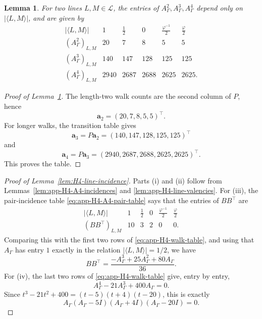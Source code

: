 \documentclass[11pt]{article}
\newtheorem{lemma}[theorem]{Lemma}
\theoremstyle{definition}
\begin{document}
\begin{lemma}\label{lem:app-H4-walk-counts}
For two lines \(L,M\in\mathcal L\), the entries of
\(A_{\Gamma}^{2},A_{\Gamma}^{3},A_{\Gamma}^{4}\) depend only on
\(|\langle L,M\rangle|\), and are given by
\begin{equation}\label{eq:app-H4-walk-table}
\begin{array}{c|ccccc}
|\langle L,M\rangle|
& 1 & \frac{1}{2} & 0 & \frac{\varphi^{-1}}{2} & \frac{\varphi}{2} \\
\hline
(A_{\Gamma}^{2})_{L,M}
& 20 & 7 & 8 & 5 & 5 \\
(A_{\Gamma}^{3})_{L,M}
& 140 & 147 & 128 & 125 & 125 \\
(A_{\Gamma}^{4})_{L,M}
& 2940 & 2687 & 2688 & 2625 & 2625 .
\end{array}
\end{equation}
\end{lemma}

\begin{proof}[Proof of Lemma~\ref{lem:app-H4-walk-counts}]
The length-two walk counts are the second column of \(P\), hence
\[
    \boldsymbol{a}_{2}=(20,7,8,5,5)^\top.
\]
For longer walks, the transition table gives
\[
    \boldsymbol{a}_{3}=P\boldsymbol{a}_{2}=(140,147,128,125,125)^\top
\]
and
\[
    \boldsymbol{a}_{4}=P\boldsymbol{a}_{3}=(2940,2687,2688,2625,2625)^\top.
\]
This proves the table.
\end{proof}

\begin{proof}[Proof of Lemma~\ref{lem:H4-line-incidence}]
Parts \textup{(i)} and \textup{(ii)} follow from
Lemmas~\ref{lem:app-H4-A4-incidences} and
\ref{lem:app-H4-line-valencies}.  For \textup{(iii)}, the pair-incidence
table \eqref{eq:app-H4-A4-pair-table} says that the entries of \(BB^\top\)
are
\[
\begin{array}{c|ccccc}
|\langle L,M\rangle|
& 1 & \frac{1}{2} & 0 & \frac{\varphi^{-1}}{2} & \frac{\varphi}{2} \\
\hline
(BB^\top)_{L,M}
& 10 & 3 & 2 & 0 & 0 .
\end{array}
\]
Comparing this with the first two rows of
\eqref{eq:app-H4-walk-table}, and using that \(A_{\Gamma}\) has entry \(1\)
exactly in the relation \(|\langle L,M\rangle|=1/2\), we have
\[
    BB^\top=\frac{-A_{\Gamma}^{3}+25A_{\Gamma}^{2}+80A_{\Gamma}}{36}.
\]
For \textup{(iv)}, the last two rows of \eqref{eq:app-H4-walk-table} give,
entry by entry,
\[
    A_{\Gamma}^{4}-21A_{\Gamma}^{3}+400A_{\Gamma}=0.
\]
Since \(t^{3}-21t^{2}+400=(t-5)(t+4)(t-20)\), this is exactly
\[
    A_{\Gamma}(A_{\Gamma}-5I)(A_{\Gamma}+4I)(A_{\Gamma}-20I)=0.
\]
\end{proof}
\end{document}
